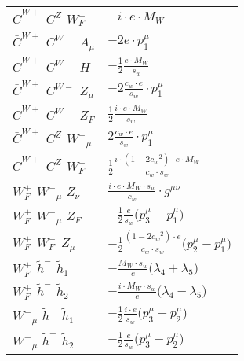 \begin{center}
\begin{tabular}{|l|l|}
$\bar{C}^{W+}{}_{}$ \phantom{-} $C^{Z}{}_{}$ \phantom{-} $W^-_F{}_{}$ \phantom{-}  &
	$- i \cdot e \cdot M_W$\\[2mm]
$\bar{C}^{W+}{}_{}$ \phantom{-} $C^{W-}{}_{}$ \phantom{-} ${A}_{\mu }$ \phantom{-}  &
	$-2 e\cdot p_1^\mu $\\[2mm]
$\bar{C}^{W+}{}_{}$ \phantom{-} $C^{W-}{}_{}$ \phantom{-} ${H}_{}$ \phantom{-}  &
	$-\frac{1}{2}\frac{ e \cdot M_W}{ s_w}$\\[2mm]
$\bar{C}^{W+}{}_{}$ \phantom{-} $C^{W-}{}_{}$ \phantom{-} ${Z}_{\mu }$ \phantom{-}  &
	$-2\frac{ c_w \cdot e}{ s_w}\cdot p_1^\mu $\\[2mm]
$\bar{C}^{W+}{}_{}$ \phantom{-} $C^{W-}{}_{}$ \phantom{-} $Z_F{}_{}$ \phantom{-}  &
	$\frac{1}{2}\frac{ i \cdot e \cdot M_W}{ s_w}$\\[2mm]
$\bar{C}^{W+}{}_{}$ \phantom{-} $C^{Z}{}_{}$ \phantom{-} $W^-{}_{\mu }$ \phantom{-}  &
	$2\frac{ c_w \cdot e}{ s_w}\cdot p_1^\mu $\\[2mm]
$\bar{C}^{W+}{}_{}$ \phantom{-} $C^{Z}{}_{}$ \phantom{-} $W^-_F{}_{}$ \phantom{-}  &
	$\frac{1}{2}\frac{ i \cdot (1-2 c_w {}^2) \cdot e \cdot M_W}{ c_w \cdot s_w}$\\[2mm]
$W^+_F{}_{}$ \phantom{-} $W^-{}_{\mu }$ \phantom{-} ${Z}_{\nu }$ \phantom{-}  &
	$\frac{ i \cdot e \cdot M_W \cdot s_w}{ c_w}\cdot g^{\mu \nu} $\\[2mm]
$W^+_F{}_{}$ \phantom{-} $W^-{}_{\mu }$ \phantom{-} $Z_F{}_{}$ \phantom{-}  &
	$-\frac{1}{2}\frac{ e}{ s_w}\big(p_3^\mu -p_1^\mu \big)$\\[2mm]
$W^+_F{}_{}$ \phantom{-} $W^-_F{}_{}$ \phantom{-} ${Z}_{\mu }$ \phantom{-}  &
	$-\frac{1}{2}\frac{ (1-2 c_w {}^2) \cdot e}{ c_w \cdot s_w}\big(p_2^\mu -p_1^\mu \big)$\\[2mm]
$W^+_F{}_{}$ \phantom{-} $\widetilde{h}^-{}_{}$ \phantom{-} $\widetilde{h}_1{}_{}$ \phantom{-}  &
	$-\frac{ M_W \cdot s_w}{ e}\big( \lambda_4+ \lambda_5\big)$\\[2mm]
$W^+_F{}_{}$ \phantom{-} $\widetilde{h}^-{}_{}$ \phantom{-} $\widetilde{h}_2{}_{}$ \phantom{-}  &
	$-\frac{ i \cdot M_W \cdot s_w}{ e}\big( \lambda_4- \lambda_5\big)$\\[2mm]
$W^-{}_{\mu }$ \phantom{-} $\widetilde{h}^+{}_{}$ \phantom{-} $\widetilde{h}_1{}_{}$ \phantom{-}  &
	$-\frac{1}{2}\frac{ i \cdot e}{ s_w}\big(p_3^\mu -p_2^\mu \big)$\\[2mm]
$W^-{}_{\mu }$ \phantom{-} $\widetilde{h}^+{}_{}$ \phantom{-} $\widetilde{h}_2{}_{}$ \phantom{-}  &
	$-\frac{1}{2}\frac{ e}{ s_w}\big(p_3^\mu -p_2^\mu \big)$\\[2mm]

\end{tabular}
\end{center}
